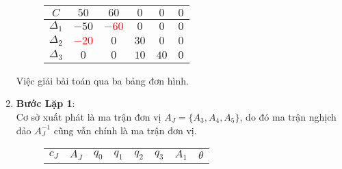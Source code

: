 \documentclass{article}
\begin{document}
\begin{enumerate}
\begin{figure}[H]
\begin{center}
\begin{tabular}{|c|c|c|c|c|c|}
                    \hline
                    $C$& 
                    \cellcolor[rgb]{0, .69, .941}$50$ & 
                    \cellcolor[rgb]{0, .69, .941}$60$ & 
                    \cellcolor[rgb]{0, .69, .941}$0$ & 
                    \cellcolor[rgb]{0, .69, .941}$0$ & 
                    \cellcolor[rgb]{0, .69, .941}$0$ \\
                    \hline
                    $\Delta_{1}$ & 
                    \cellcolor[rgb]{1, .753, .0}$-50$ & 
                    \cellcolor[rgb]{1, .753, .0}\textcolor{red}{$-60$} & 
                    \cellcolor[rgb]{1, .753, .0}$0$ & 
                    \cellcolor[rgb]{1, .753, .0}$0$ & 
                    \cellcolor[rgb]{1, .753, .0}$0$ \\
                    \hline
                    $\Delta_{2}$ & 
                    \cellcolor[rgb]{1, .753, .0}\textcolor{red}{$-20$} & 
                    \cellcolor[rgb]{1, .753, .0}$0$ & 
                    \cellcolor[rgb]{1, .753, .0}$30$ & 
                    \cellcolor[rgb]{1, .753, .0}$0$ & 
                    \cellcolor[rgb]{1, .753, .0}$0$ \\
                    \hline
                    $\Delta_{3}$ & 
                    \cellcolor[rgb]{1, .753, .0}$0$ & 
                    \cellcolor[rgb]{1, .753, .0}$0$ & 
                    \cellcolor[rgb]{1, .753, .0}$10$ & 
                    \cellcolor[rgb]{1, .753, .0}$40$ & 
                    \cellcolor[rgb]{1, .753, .0}$0$ \\
                    \hline
                \end{tabular}
            \end{center}  
        \end{figure}
        Việc giải bài toán qua ba bảng đơn hình. \\
        \newpage
        \item \textbf{Bước Lặp 1}: \\
        Cơ sở xuất phát là ma trận đơn vị $A_J=\{A_3,A_4,A_5\}$, do đó ma trận nghịch đảo $A_J^{-1}$ cũng vẫn chính là ma trận đơn vị.
        \begin{figure}[H]
            \begin{center}
                \begin{tabular}{|c|c|c|c|c|c|c|c|}
                    \hline
                    $c_J$ & 
                    $A_J$ & 
                    $q_0$ & 
                    $q_1$ & 
                    $q_2$ & 
                    $q_3$ &
                    $A_1$ & 
                     $\theta$ \\

\end{tabular}
\end{center}
\end{figure}
\end{enumerate}
\end{document}
